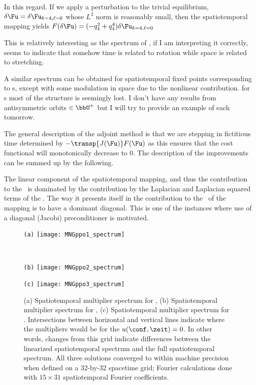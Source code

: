 In this regard. If we apply a perturbation to the trivial equilibrium, $\delta \Fu = \delta \Fu_{k=4,\ell=0}$
whose $L^2$ norm is reasonably small, then the spatiotemporal mapping yields $F(\delta \Fu) = (-q_4^2 +q_4^4)\delta \Fu_{k=4,\ell=0}$

This is relatively interesting as the spectrum of , if I am interpreting it correctly, seems to indicate
that somehow time is related to rotation while space is related to stretching.

A similar spectrum can be obtained for spatiotemporal fixed points
corresponding to {\ppo}s, except with some modulation in space due to the
nonlinear contribution. for {\rpo}s most of the structure is seemingly
lost. I don't have any results from antisymmetric orbits $\in \bbU^+$ but
I will try to provide an example of each tomorrow.

The general description of the adjoint method is that we are stepping
in fictitious time determined by $-\transp{J(\Fu)} F(\Fu)$ as this ensures that
the cost functional will monotonically decrease to $0$. The description of the improvements
can be summed up by the following.

The linear component of the spatiotemporal mapping, and thus the contribution
to the \jacobianM\ is dominated by the contribution by the Laplacian and
Laplacian squared terms of the \KSe. The way it presents itself in the
contribution to the \jacobianM\ of the mapping is to have a dominant
diagonal. This is one of the instances where use of a diagonal (Jacobi)
preconditioner is motivated.



\begin{figure}
\begin{minipage}[height=.32\textheight]{.45\textwidth}
\centering \small{\texttt{(a)}}
\texttt{[image: MNGppo1\_spectrum]}
\end{minipage}
\\
\begin{minipage}[height=.32\textheight]{.45\textwidth}
\centering \small{\texttt{(b)}}
\texttt{[image: MNGppo2\_spectrum]}
\end{minipage}
\begin{minipage}[height=.32\textheight]{.45\textwidth}
\centering \small{\texttt{(c)}}
\texttt{[image: MNGppo3\_spectrum]}
\end{minipage}
\caption{ \label{fig:MNGppospacetimespec}
(a) Spatiotemporal multiplier spectrum for ,
(b) Spatiotemporal multiplier spectrum for ,
(c) Spatiotemporal multiplier spectrum for .
Intersections between horizontal and vertical lines indicate where the
multipliers would be for the $u(\conf,\zeit)=0$.
In other words, changes from this grid indicate
differences between the linearized spatiotemporal spectrum and the full
spatiotemporal spectrum. All three solutions converged to within machine
precision when defined on a 32-by-32 spacetime grid; Fourier calculations
done with $15 \times 31$ spatiotemporal Fourier coefficients.
}
\end{figure}

